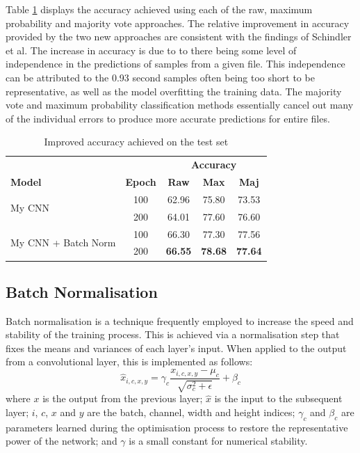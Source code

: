 \documentclass[conference]{IEEEtran}
\begin{document}
Table \ref{improved_results} displays the accuracy achieved using each of the raw, maximum probability and majority vote approaches.
The relative improvement in accuracy provided by the two new approaches are consistent with the findings of Schindler et al.
The increase in accuracy is due to to there being some level of independence in the predictions of samples from a given file.
This independence can be attributed to the 0.93 second samples often being too short to be representative, as well as the model overfitting the training data.
The majority vote and maximum probability classification methods essentially cancel out many of the individual errors to produce more accurate predictions for entire files.

\begin{table}[htbp]
    \caption{Improved accuracy achieved on the test set}
    \begin{center}
    \begin{tabular}{l c c c c}
    \toprule
    &&\multicolumn{3}{c}{\textbf{Accuracy}}\\
    \cmidrule(lr){3-5}
    \textbf{Model}&\textbf{Epoch}&\textbf{Raw}&\textbf{Max}&\textbf{Maj}\\
    \midrule
    \multirow{ 2}{*}{My CNN} & 100 & 62.96 & 75.80 & 73.53 \\
    & 200 & 64.01 & 77.60 & 76.60 \\
    \midrule
    \multirow{ 2}{*}{My CNN + Batch Norm} & 100 & 66.30 & 77.30 & 77.56 \\
    & 200 & \textbf{66.55} & \textbf{78.68} & \textbf{77.64} \\
    \bottomrule
    \end{tabular}
    \label{improved_results}
    \end{center}
\end{table}

\subsection{Batch Normalisation}

Batch normalisation \cite{IoffeSzegedy} is a technique frequently employed to increase the speed and stability of the training process.
This is achieved via a normalisation step that fixes the means and variances of each layer's input.
When applied to the output from a convolutional layer, this is implemented as follows:
\[
\hat{x}_{i,c,x,y}=\gamma_c\frac{x_{i,c,x,y}-\mu_c}{\sqrt{\sigma_c^2+\epsilon}}+\beta_c
\]
where $x$ is the output from the previous layer; $\hat{x}$ is the input to the subsequent layer; $i$, $c$, $x$ and $y$ are the batch, channel, width and height indices; $\gamma_c$ and $\beta_c$ are parameters learned during the optimisation process to restore the representative power of the network; and $\gamma$ is a small constant for numerical stability.
\end{document}
